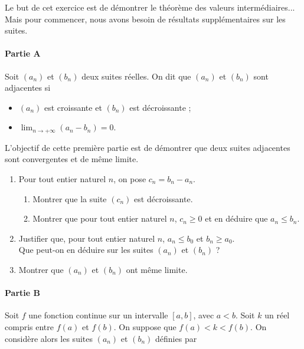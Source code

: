 \documentclass[11pt,fleqn, openany]{book} %
\begin{document}
\begin{exercise}[subtitle={(Démontrer le théorème des valeurs intermédiaires)}]

Le but de cet exercice est de démontrer le théorème des valeurs intermédiaires... Mais pour commencer, nous avons besoin de résultats supplémentaires sur les suites.

\paragraph{Partie A}

Soit $(a_n)$ et $(b_n)$ deux suites réelles. On dit que $(a_n)$ et $(b_n)$ sont adjacentes si
\begin{itemize}
\item $(a_n)$ est croissante et $(b_n)$ est décroissante ;
\item $\displaystyle \lim_{n \to + \infty} (a_n-b_n)=0$.
\end{itemize}
L'objectif de cette première partie est de démontrer que deux suites adjacentes sont convergentes et de même limite.

\begin{enumerate}
\item Pour tout entier naturel $n$, on pose $c_n = b_n-a_n$.
\begin{enumerate}
\item Montrer que la suite $(c_n)$ est décroissante.
\item Montrer que pour tout entier naturel $n$, $c_n \geqslant 0$ et en déduire que $a_n \leqslant b_n$.
\end{enumerate}
\item Justifier que, pour tout entier naturel $n$, $a_n \leqslant b_0$ et $b_n \geqslant a_0$. \\ Que peut-on en déduire sur les suites $(a_n)$ et $(b_n)$ ?
\item Montrer que $(a_n)$ et $(b_n)$ ont même limite.
\end{enumerate}

\paragraph{Partie B}

Soit $f$ une fonction continue sur un intervalle $[a,b]$, avec $a<b$. Soit $k$ un réel compris entre $f(a)$ et $f(b)$. On suppose que $f(a) < k < f(b)$. On considère alors les suites $(a_n)$ et $(b_n)$ définies par


\end{exercise}
\end{document}
